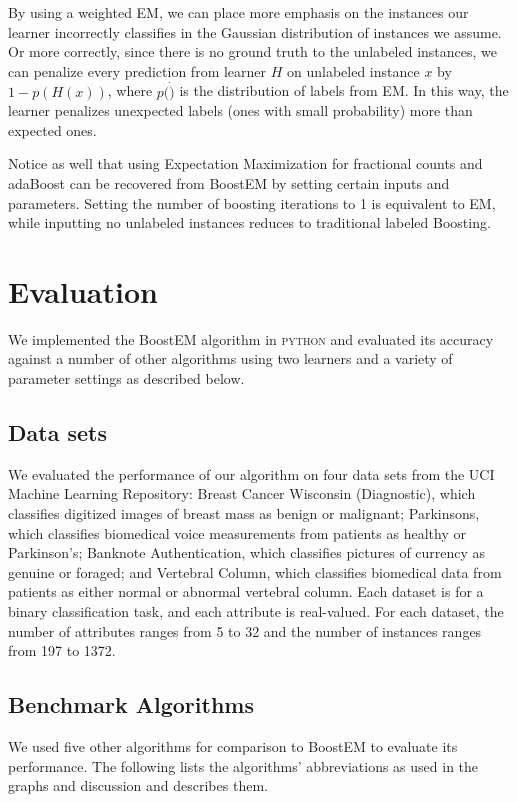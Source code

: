 \documentclass{sig-alternate}
\begin{document}
By using a weighted EM, we can place more emphasis on the instances our learner incorrectly classifies in the Gaussian distribution of instances we assume. Or more correctly, since there is no ground truth to the unlabeled instances, we can penalize every prediction from learner $H$ on unlabeled instance $x$ by $1-p(H(x))$, where $p(\dot)$ is the distribution of labels from EM.  In this way, the learner penalizes unexpected labels (ones with small probability) more than expected ones.

Notice as well that using Expectation Maximization for fractional counts and adaBoost can be recovered from BoostEM by setting certain inputs and parameters.  Setting the number of boosting iterations to 1 is equivalent to EM, while inputting no unlabeled instances reduces to traditional labeled Boosting.    
    
\section{Evaluation}
We implemented the BoostEM algorithm in \textsc{python} and evaluated its accuracy against a number of other algorithms using two learners and a variety of parameter settings  as described below.

\subsection{Data sets}

We evaluated the performance of our algorithm on four data sets from the UCI Machine Learning Repository: Breast Cancer Wisconsin (Diagnostic), which classifies digitized images of breast mass as benign or malignant; Parkinsons, which classifies biomedical voice measurements from patients as healthy or Parkinson's; Banknote Authentication, which classifies pictures of currency as genuine or foraged; and Vertebral Column, which classifies biomedical data from patients as either normal or abnormal vertebral column. Each dataset is for a binary classification task, and each attribute is real-valued. For each dataset, the number of attributes ranges from 5 to 32 and the number of instances ranges from 197 to 1372. 

\subsection{Benchmark Algorithms}

We used five other algorithms for comparison to BoostEM to evaluate its performance. The following lists the algorithms' abbreviations as used in the graphs and discussion and describes them.
\end{document}
